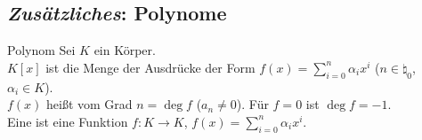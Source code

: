 \subsection{%
    \emph{Zusätzliches}: Polynome%
}

\begin{Def}{Polynom}
    Sei $K$ ein Körper. \\
    $K[x]$ ist die Menge der Ausdrücke der Form
    $f(x) = \sum_{i=0}^n \alpha_i x^i$ ($n \in \natural_0$,
    $\alpha_i \in K$). \\
    $f(x)$ heißt  vom Grad $n = \deg f$ ($a_n \not= 0$).
    Für $f = 0$ ist $\deg f = -1$. \\
    Eine  ist eine Funktion
    $f: K \rightarrow K$, $f(x) = \sum_{i = 0}^n \alpha_i x^i$.
\end{Def}

\pagebreak
